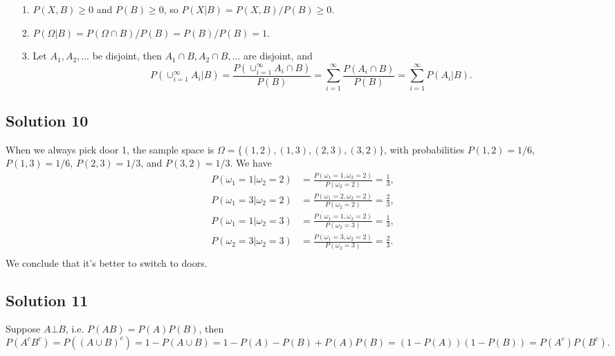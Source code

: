 \begin{itemize}
    \item[1.] $P(X, B) \geq 0$ and $P(B) \geq 0$, so $P(X|B) = P(X, B) / P(B) \geq 0$.
    \item[2.] $P(\Omega|B) = P(\Omega \cap B) / P(B) = P(B) / P(B) = 1$.
    \item[3.] Let $A_1, A_2, ...$ be disjoint, then $A_1 \cap B, A_2 \cap B, ...$ are disjoint, and
        \begin{equation*}
            P(\cup_{i = 1}^{\infty} A_i | B)
                = \frac{P(\cup_{i = 1}^{\infty} A_i \cap B)}{P(B)}
                = \sum_{i = 1}^{\infty} \frac{P(A_i \cap B)}{P(B)}
                = \sum_{i = 1}^{\infty} P(A_i | B).
        \end{equation*}
\end{itemize}


\subsection*{Solution 10}

When we always pick door 1, the sample space is $\Omega = \{(1, 2), (1, 3), (2, 3), (3, 2)\}$, with probabilities $P(1, 2) = 1/6$, $P(1, 3) = 1/6$, $P(2, 3) = 1/3$, and $P(3, 2) = 1/3$.
We have
\begin{equation*}
    \begin{split}
        P(\omega_1 = 1 | \omega_2 = 2) &= \frac{P(\omega_1 = 1, \omega_2 = 2)}{P(\omega_2 = 2)} = \frac{1}{3}, \\
        P(\omega_1 = 3 | \omega_2 = 2) &= \frac{P(\omega_1 = 2, \omega_2 = 2)}{P(\omega_2 = 2)} = \frac{2}{3}, \\
        P(\omega_1 = 1 | \omega_2 = 3) &= \frac{P(\omega_1 = 1, \omega_2 = 2)}{P(\omega_2 = 3)} = \frac{1}{3}, \\
        P(\omega_2 = 3 | \omega_2 = 3) &= \frac{P(\omega_1 = 3, \omega_2 = 2)}{P(\omega_2 = 3)} = \frac{2}{3}. \\
    \end{split}
\end{equation*}
We conclude that it's better to switch to doors.


\subsection*{Solution 11}

Suppose $A \bot B$, i.e. $P(AB) = P(A)P(B)$, then
\begin{equation*}
    P(A^c B^c) = P((A \cup B)^c)
        = 1 - P(A \cup B)
        = 1 - P(A) - P(B) + P(A)P(B)
        = (1 - P(A))(1 - P(B))
        = P(A^c) P(B^c).
\end{equation*}



